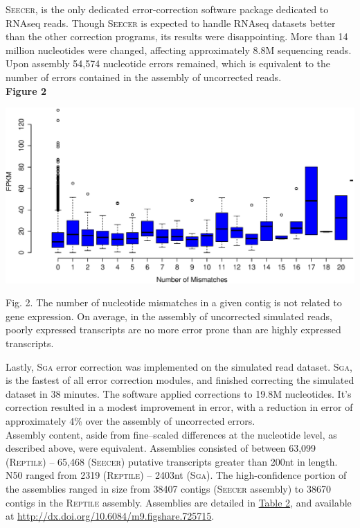 \documentclass[11pt]{article}
\begin{document}
\noindent
\textsc{Seecer}, is the only dedicated error-correction software package dedicated to RNAseq reads. Though \textsc{Seecer} is expected to handle RNAseq datasets better than the other correction programs, its results were disappointing. More than 14 million nucleotides were changed, affecting approximately 8.8M sequencing reads.  Upon assembly 54,574 nucleotide errors remained, which is equivalent to the number of errors contained in the assembly of uncorrected reads.   \\

\textbf{\hypertarget{Figure 2}{Figure 2}} \\
\centerline{\includegraphics[width=22.0\baselineskip]{FigZ.eps}}
\begin{changemargin}{2cm}{2cm}
\noindent
Fig. 2. The number of nucleotide mismatches in a given contig is not related to gene expression. On average, in the assembly of uncorrected simulated reads, poorly expressed transcripts are no more error prone than are highly expressed transcripts.
\end{changemargin}
\vspace{10mm}

\noindent 
Lastly, \textsc{Sga} error correction was implemented on the simulated read dataset. \textsc{Sga}, is the fastest of all error correction modules, and finished correcting the simulated dataset in 38 minutes.  The software applied corrections to 19.8M nucleotides.  It's correction resulted in a modest improvement in error, with a reduction in error of approximately 4\% over the assembly of uncorrected errors.  \\
 
\noindent
Assembly content, aside from fine--scaled differences at the nucleotide level, as described above, were equivalent. Assemblies consisted of between 63,099 (\textsc{Reptile}) -- 65,468 (\textsc{Seecer}) putative transcripts greater than 200nt in length. N50 ranged from 2319 (\textsc{Reptile}) -- 2403nt (\textsc{Sga}).  The high-confidence portion of the assemblies ranged in size from 38407 contigs (\textsc{Seecer} assembly) to 38670 contigs in the \textsc{Reptile} assembly. Assemblies are detailed in \hyperlink{Table 2}{Table 2}, and available at \url{http://dx.doi.org/10.6084/m9.figshare.725715}. \\
\end{document}
